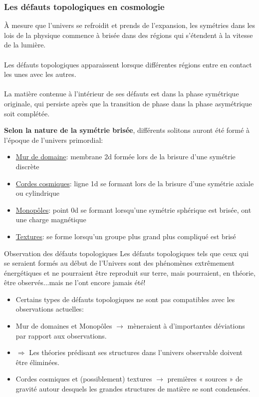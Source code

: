 \documentclass{beamer}
\begin{document}
 \begin{frame}
  \frametitle{Les défauts topologiques en cosmologie}
À mesure que l'univers se refroidit et prends de l'expansion, les symétries dans les lois de la physique commence à brisée dans des régions qui s'étendent à la vitesse de la lumière. \\
~~\\
Les défauts topologiques apparaissent lorsque différentes régions entre en contact les unes avec les autres. \\
~~\\
La matière contenue à l'intérieur de ses défauts est dans la phase symétrique originale, qui persiste après que la transition de phase dans la phase asymétrique soit complétée. 
 \end{frame}
 
 
 \begin{frame}
\textbf{Selon la nature de la symétrie brisée}, différents solitons auront été formé à l'époque de l'univers primordial:
\begin{itemize}
\item<2-> \underline{Mur de domaine}: membrane 2d formée lors de la brisure d'une symétrie discrète
\item<2-> \underline{Cordes cosmiques}: ligne 1d se formant lors de la brisure d'une symétrie axiale ou cylindrique
\item<2-> \underline{Monopôles}: point 0d se formant lorsqu'une symétrie sphérique est brisée, ont une charge magnétique
\item<2-> \underline{Textures}: se forme lorsqu'un groupe plus grand plus compliqué est brisé 
\end{itemize}
\end{frame}



\begin{frame}
\begin{block}{Observation des défauts topologiques}
Les défauts topologiques tels que ceux qui se seraient formés au début de l'Univers sont des phénomènes extrêmement énergétiques et ne pourraient être reproduit sur terre, mais pourraient, en théorie, être observés...mais ne l'ont encore jamais été!
\begin{itemize}
\item Certains types de défauts topologiques ne sont pas compatibles avec les observations actuelles:
\item Mur de domaines et Monopôles $\rightarrow$ mèneraient à d'importantes déviations par rapport aux observations. 
\item $\Rightarrow$ Les théories prédisant ses structures dans l'univers observable doivent être éliminées. 
\item Cordes cosmiques et (possiblement) textures $\rightarrow$ premières « sources » de gravité autour desquels les grandes structures de matière se sont condensées.
\end{itemize}
\end{block}
\end{frame}
\end{document}
